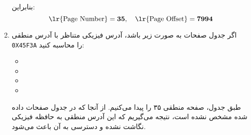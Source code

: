 \begin{enumerate}
\begin{qsolve}
		بنابراین:
		\[
		\text{\lr{Page Number}} = \mathbf{35}, \quad \text{\lr{Page Offset}} = \mathbf{7994}
		\]
	\end{qsolve}
	
	
	
	
	\item اگر جدول صفحات به صورت زیر باشد، آدرس فیزیکی متناظر با آدرس منطقی \texttt{0X45F3A} را محاسبه کنید:



\begin{latin}
	\begin{itemize}
		\item {}
		\item {}
		\item {}
		\item {}
	\end{itemize}
\end{latin}

\begin{qsolve}
	
طبق جدول، صفحه منطقی ۳۵ را پیدا می‌کنیم. از آنجا که در جدول صفحات داده شده  مشخص نشده است، نتیجه می‌گیریم که این آدرس منطقی به حافظه فیزیکی نگاشت نشده و دسترسی به آن باعث  می‌شود.
	
\end{qsolve}

\end{enumerate}
